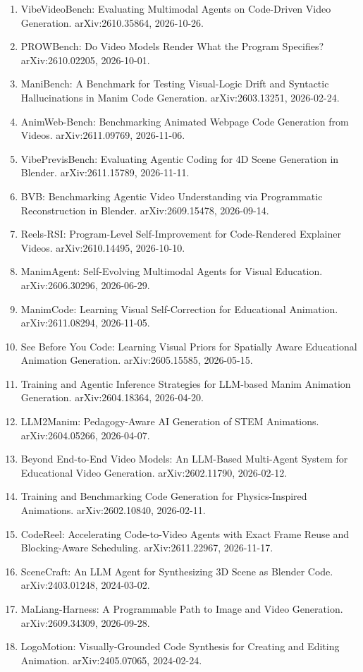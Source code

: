 \begin{enumerate}
  \item VibeVideoBench: Evaluating Multimodal Agents on Code-Driven Video Generation. arXiv:2610.35864, 2026-10-26.
  \item PROWBench: Do Video Models Render What the Program Specifies? arXiv:2610.02205, 2026-10-01.
  \item ManiBench: A Benchmark for Testing Visual-Logic Drift and Syntactic Hallucinations in Manim Code Generation. arXiv:2603.13251, 2026-02-24.
  \item AnimWeb-Bench: Benchmarking Animated Webpage Code Generation from Videos. arXiv:2611.09769, 2026-11-06.
  \item VibePrevisBench: Evaluating Agentic Coding for 4D Scene Generation in Blender. arXiv:2611.15789, 2026-11-11.
  \item BVB: Benchmarking Agentic Video Understanding via Programmatic Reconstruction in Blender. arXiv:2609.15478, 2026-09-14.
  \item Reels-RSI: Program-Level Self-Improvement for Code-Rendered Explainer Videos. arXiv:2610.14495, 2026-10-10.
  \item ManimAgent: Self-Evolving Multimodal Agents for Visual Education. arXiv:2606.30296, 2026-06-29.
  \item ManimCode: Learning Visual Self-Correction for Educational Animation. arXiv:2611.08294, 2026-11-05.
  \item See Before You Code: Learning Visual Priors for Spatially Aware Educational Animation Generation. arXiv:2605.15585, 2026-05-15.
  \item Training and Agentic Inference Strategies for LLM-based Manim Animation Generation. arXiv:2604.18364, 2026-04-20.
  \item LLM2Manim: Pedagogy-Aware AI Generation of STEM Animations. arXiv:2604.05266, 2026-04-07.
  \item Beyond End-to-End Video Models: An LLM-Based Multi-Agent System for Educational Video Generation. arXiv:2602.11790, 2026-02-12.
  \item Training and Benchmarking Code Generation for Physics-Inspired Animations. arXiv:2602.10840, 2026-02-11.
  \item CodeReel: Accelerating Code-to-Video Agents with Exact Frame Reuse and Blocking-Aware Scheduling. arXiv:2611.22967, 2026-11-17.
  \item SceneCraft: An LLM Agent for Synthesizing 3D Scene as Blender Code. arXiv:2403.01248, 2024-03-02.
  \item MaLiang-Harness: A Programmable Path to Image and Video Generation. arXiv:2609.34309, 2026-09-28.
  \item LogoMotion: Visually-Grounded Code Synthesis for Creating and Editing Animation. arXiv:2405.07065, 2024-02-24.
\end{enumerate}


